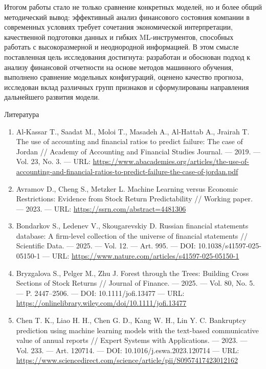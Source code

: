 \documentclass[
]{article}
\begin{document}
Итогом работы стало не только сравнение конкретных моделей, но и более общий методический вывод: эффективный анализ финансового состояния компании в современных условиях требует сочетания экономической интерпретации, качественной подготовки данных и гибких ML-инструментов, способных работать с высокоразмерной и неоднородной информацией. В этом смысле поставленная цель исследования достигнута: разработан и обоснован подход к анализу финансовой отчетности на основе методов машинного обучения, выполнено сравнение модельных конфигураций, оценено качество прогноза, исследован вклад различных групп признаков и сформулированы направления дальнейшего развития модели.

Литература

\begin{enumerate}
\def\labelenumi{\arabic{enumi}.}
\item
  Al-Kassar T., Saadat M., Moloi T., Masadeh A., Al-Hattab A., Jrairah T. The use of accounting and financial ratios to predict failure: The case of Jordan // Academy of Accounting and Financial Studies Journal. --- 2019. --- Vol. 23, No. 3. --- URL: \url{https://www.abacademies.org/articles/the-use-of-accounting-and-financial-ratios-to-predict-failure-the-case-of-jordan.pdf}
\item
  Avramov D., Cheng S., Metzker L. Machine Learning versus Economic Restrictions: Evidence from Stock Return Predictability // Working paper. --- 2023. --- URL: \url{https://ssrn.com/abstract=4481306}
\item
  Bondarkov S., Ledenev V., Skougarevskiy D. Russian financial statements database: A firm-level collection of the universe of financial statements // Scientific Data. --- 2025. --- Vol. 12. --- Art. 995. --- DOI: 10.1038/s41597-025-05150-1 --- URL: \url{https://www.nature.com/articles/s41597-025-05150-1}
\item
  Bryzgalova S., Pelger M., Zhu J. Forest through the Trees: Building Cross Sections of Stock Returns // Journal of Finance. --- 2025. --- Vol. 80, No. 5. --- P. 2447--2506. --- DOI: 10.1111/jofi.13477 --- URL: \url{https://onlinelibrary.wiley.com/doi/10.1111/jofi.13477}
\item
  Chen T. K., Liao H. H., Chen G. D., Kang W. H., Lin Y. C. Bankruptcy prediction using machine learning models with the text-based communicative value of annual reports // Expert Systems with Applications. --- 2023. --- Vol. 233. --- Art. 120714. --- DOI: 10.1016/j.eswa.2023.120714 --- URL: \url{https://www.sciencedirect.com/science/article/pii/S0957417423012162}

\end{enumerate}
\end{document}
